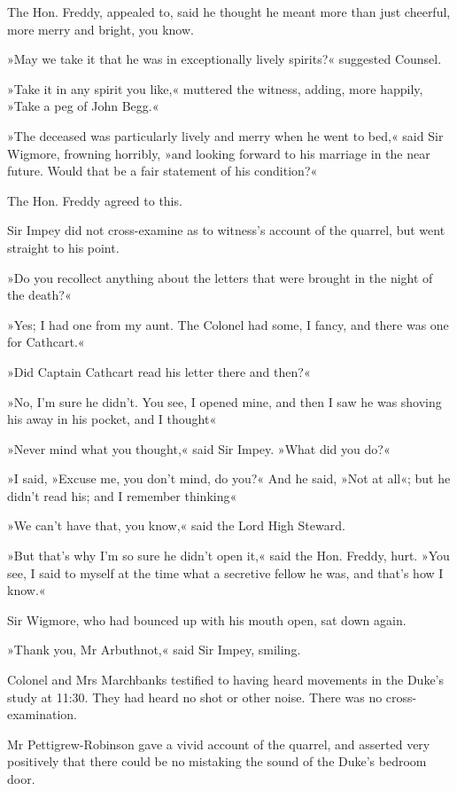 The Hon. Freddy, appealed to, said he thought he meant more than just cheerful, more merry and bright, you know.

»May we take it that he was in exceptionally lively spirits?« suggested Counsel.

»Take it in any spirit you like,« muttered the witness, adding, more happily, »Take a peg of John Begg.«

»The deceased was particularly lively and merry when he went to bed,« said Sir Wigmore, frowning horribly, »and looking forward to his marriage in the near future. Would that be a fair statement of his condition?«

The Hon. Freddy agreed to this.

Sir Impey did not cross-examine as to witness's account of the quarrel, but went straight to his point.

»Do you recollect anything about the letters that were brought in the night of the death?«

»Yes; I had one from my aunt. The Colonel had some, I fancy, and there was one for Cathcart.«

»Did Captain Cathcart read his letter there and then?«

»No, I'm sure he didn't. You see, I opened mine, and then I saw he was shoving his away in his pocket, and I thought\longdash«

»Never mind what you thought,« said Sir Impey. »What did you do?«

»I said, »Excuse me, you don't mind, do you?« And he said, »Not at all«; but he didn't read his; and I remember thinking\longdash«

»We can't have that, you know,« said the Lord High Steward.

»But that's why I'm so sure he didn't open it,« said the Hon. Freddy, hurt. »You see, I said to myself at the time what a secretive fellow he was, and that's how I know.«

Sir Wigmore, who had bounced up with his mouth open, sat down again.

»Thank you, Mr Arbuthnot,« said Sir Impey, smiling.

Colonel and Mrs Marchbanks testified to having heard movements in the Duke's study at 11:30. They had heard no shot or other noise. There was no cross-examination.

Mr Pettigrew-Robinson gave a vivid account of the quarrel, and asserted very positively that there could be no mistaking the sound of the Duke's bedroom door.

